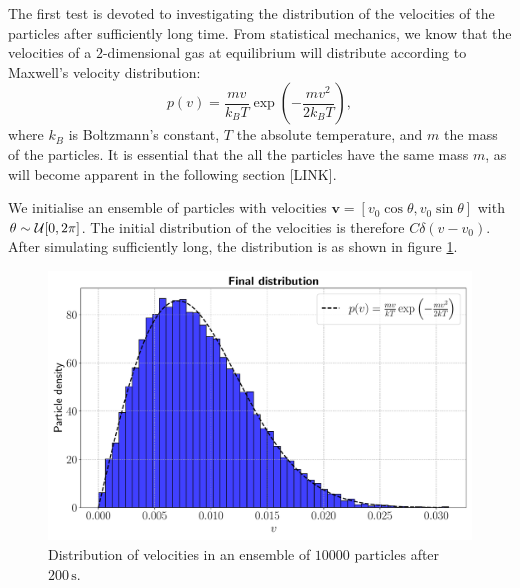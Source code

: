 The first test is devoted to investigating the distribution of the velocities of the particles after sufficiently long time. From statistical mechanics, we know that the velocities of a $2$-dimensional gas at equilibrium will distribute according to Maxwell's velocity distribution: 
\[
	p(v) = \frac{mv}{k_B T} \exp{\left(- \frac{mv^2}{2 k_B T}\right)},
\]
where $k_B$ is Boltzmann's constant, $T$ the absolute temperature, and $m$ the mass of the particles. It is essential that the all the particles have the same mass $m$, as will become apparent in the following section [LINK].

We initialise an ensemble of particles with velocities $\mathbf{v} = [v_0 \cos{\theta} , v_0 \sin{\theta}]$ with $\theta \sim \mathcal{U}[0,2\pi]$. The initial distribution of the velocities is therefore $C\delta (v - v_0)$. After simulating sufficiently long, the distribution is as shown in figure \ref{fig:dist_1}.

\begin{figure}[htb]
	\label{fig:dist_1}
	\centering
	\includegraphics[width=\textwidth]{../fig/dist_1}
	\caption{Distribution of velocities in an ensemble of $10000$ particles after $200 \,\text{s}$.}
\end{figure}